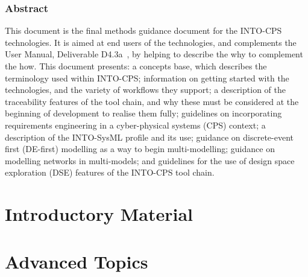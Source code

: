 \documentclass[narrowmargin,final,12pt,a4paper]{include/intocpsassociation}   %
\begin{document}
\maketitle


\section*{Abstract}
\label{sec:abstract}

This document is the final methods guidance document for the INTO-CPS technologies. It is aimed at end users of the technologies, and complements the User Manual, Deliverable D4.3a~\cite{INTOCPSD4.3a}, by helping to describe the why to complement the how. This document presents: a concepts base, which describes the terminology used within INTO-CPS; information on getting started with the technologies, and the variety of workflows they support; a description of the traceability features of the tool chain, and why these must be considered at the beginning of development to realise them fully; guidelines on incorporating requirements engineering in a cyber-physical systems (CPS) context; a description of the INTO-SysML profile and its use; guidance on discrete-event first (DE-first) modelling as a way to begin multi-modelling; guidance on modelling networks in multi-models; and guidelines for the use of design space exploration (DSE) features of the INTO-CPS tool chain.

\newpage

\tableofcontents
\newpage

\part{Introductory Material}
\label{part:intro}





\part{Advanced Topics}
\label{part:advanced}







%

\newpage


\label{ch:bib} %
\end{document}
